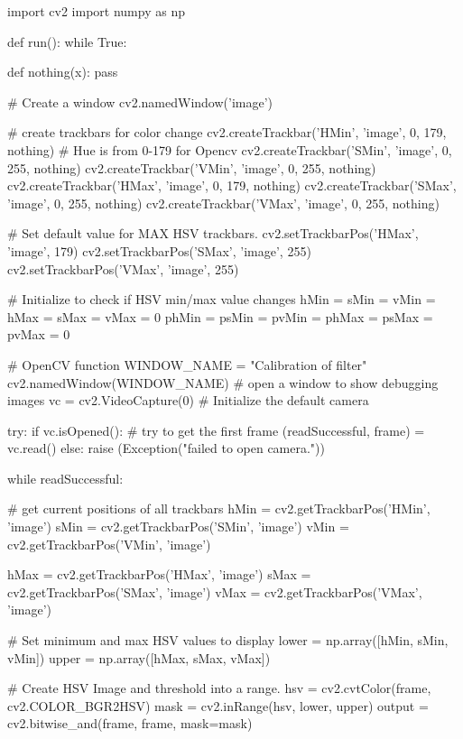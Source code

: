 \begin{pyverbatim}
import cv2
import numpy as np


def run():
    while True:

        def nothing(x):
            pass

        # Create a window
        cv2.namedWindow('image')

        # create trackbars for color change
        cv2.createTrackbar('HMin', 'image', 0, 179, nothing)  # Hue is from 0-179 for Opencv
        cv2.createTrackbar('SMin', 'image', 0, 255, nothing)
        cv2.createTrackbar('VMin', 'image', 0, 255, nothing)
        cv2.createTrackbar('HMax', 'image', 0, 179, nothing)
        cv2.createTrackbar('SMax', 'image', 0, 255, nothing)
        cv2.createTrackbar('VMax', 'image', 0, 255, nothing)

        # Set default value for MAX HSV trackbars.
        cv2.setTrackbarPos('HMax', 'image', 179)
        cv2.setTrackbarPos('SMax', 'image', 255)
        cv2.setTrackbarPos('VMax', 'image', 255)

        # Initialize to check if HSV min/max value changes
        hMin = sMin = vMin = hMax = sMax = vMax = 0
        phMin = psMin = pvMin = phMax = psMax = pvMax = 0

        # OpenCV function
        WINDOW_NAME = "Calibration of filter"
        cv2.namedWindow(WINDOW_NAME)  # open a window to show debugging images
        vc = cv2.VideoCapture(0)  # Initialize the default camera

        try:
            if vc.isOpened():  # try to get the first frame
                (readSuccessful, frame) = vc.read()
            else:
                raise (Exception("failed to open camera."))

            while readSuccessful:

                # get current positions of all trackbars
                hMin = cv2.getTrackbarPos('HMin', 'image')
                sMin = cv2.getTrackbarPos('SMin', 'image')
                vMin = cv2.getTrackbarPos('VMin', 'image')

                hMax = cv2.getTrackbarPos('HMax', 'image')
                sMax = cv2.getTrackbarPos('SMax', 'image')
                vMax = cv2.getTrackbarPos('VMax', 'image')

                # Set minimum and max HSV values to display
                lower = np.array([hMin, sMin, vMin])
                upper = np.array([hMax, sMax, vMax])

                # Create HSV Image and threshold into a range.
                hsv = cv2.cvtColor(frame, cv2.COLOR_BGR2HSV)
                mask = cv2.inRange(hsv, lower, upper)
                output = cv2.bitwise_and(frame, frame, mask=mask)


\end{pyverbatim}
